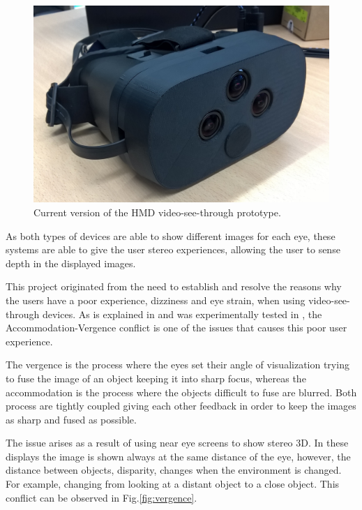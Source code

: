 \documentclass[10pt,a4paper,twocolumn,twoside]{article}
\begin{document}
	\begin{figure}
		\centering
		\includegraphics[width=1\linewidth]{img/imagenproto3.jpg}
		\caption{Current version of the HMD video-see-through prototype.}
		\label{fig:proto}
	\end{figure}
	
	As both types of devices are able to show different images for each eye, these systems are able to give the user stereo experiences, allowing the user to sense depth in the displayed images. 
	
	This project originated from the need to establish and resolve the reasons why the users have a poor experience, dizziness and eye strain, when using video-see-through devices. As is explained in \cite{disconfortReview} and was experimentally tested in \cite{vergenceDisconfort}, the Accommodation-Vergence conflict is one of the issues that causes this poor user experience.
	
	The vergence is the process where the eyes set their angle of visualization trying to fuse the image of an object keeping it into sharp focus, whereas the accommodation is the process where the objects difficult to fuse are blurred. Both process are tightly coupled giving each other feedback in order to keep the images as sharp and fused as possible. 
	
	The issue arises as a result of using near eye screens to show stereo 3D. In these displays the image is shown always at the same distance of the eye, however, the distance between objects, disparity,  changes when the environment is changed. For example, changing from looking at a distant object to a close object.  This conflict can be observed in Fig.\ref{fig:vergence}.
	
\end{document}
